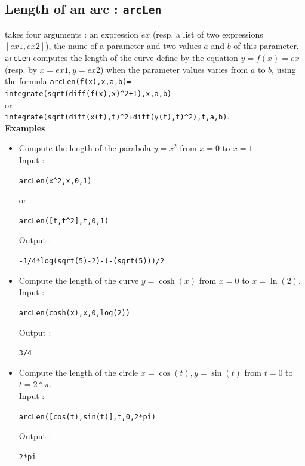 \documentclass[a4paper,11pt]{book}
\begin{document}
\subsection{Length of an arc : {\tt arcLen}}
 takes four arguments : an expression $ex$ (resp. a list
of two expressions $[ex1,ex2]$), the name of a parameter and two values $a$
and $b$ of this parameter.\\
{\tt arcLen} computes the length of the curve define by the equation 
$y=f(x)=ex$ (resp. by $x=ex1,y=ex2$) when the parameter values varies from $a$ 
to $b$, using the formula
{\tt arcLen(f(x),x,a,b)=}\\  
{\tt integrate(sqrt(diff(f(x),x)\verb|^|2+1),x,a,b)}\\
or \\
{\tt integrate(sqrt(diff(x(t),t)\verb|^|2+diff(y(t),t)\verb|^|2),t,a,b)}.\\

{\bf Examples}
\begin{itemize}
\item Compute the length of the parabola $y=x^2$ from $x=0$ to $x=1$.\\
Input :
\begin{center}{\tt arcLen(x\verb|^|2,x,0,1)}\end{center}
or
\begin{center}{\tt arcLen([t,t\verb|^|2],t,0,1)}\end{center}
Output :
\begin{center}{\tt -1/4*log(sqrt(5)-2)-(-(sqrt(5)))/2}\end{center} 
\item Compute the length of the curve $y=\cosh(x)$ from $x=0$ to 
$x=\ln(2)$.\\
Input :
\begin{center}{\tt arcLen(cosh(x),x,0,log(2))}\end{center}
Output :
\begin{center}{\tt 3/4}\end{center}
\item Compute the length of the circle $x=\cos(t),y=\sin(t)$ from $t=0$ to 
$t=2*\pi$.\\
Input :
\begin{center}{\tt arcLen([cos(t),sin(t)],t,0,2*pi)}\end{center}
Output :
\begin{center}{\tt 2*pi}\end{center}
\end{itemize}
\end{document}
